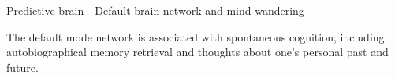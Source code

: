 \begin{frame}{Predictive brain - Default brain network and mind wandering}
    
    The default mode network is associated with spontaneous cognition, including autobiographical memory retrieval and thoughts about one’s personal past and future.
    \cite{raichle-2015-the-brains-default-mode-network, andrews-hanna-2010-evidence-for-the-default-networks-role-in-spontaneous-cognition}

\end{frame}